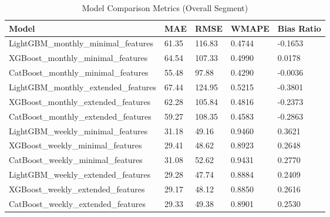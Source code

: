 \begin{table}[hbt!]
\centering
\caption{Model Comparison Metrics (Overall Segment)}
\label{tab:model_comparison}
\begin{tabular}{@{} lllll @{}}
\toprule
\textbf{Model} & \textbf{MAE} & \textbf{RMSE} & \textbf{WMAPE} & \textbf{Bias Ratio} \\
\midrule
LightGBM\_monthly\_minimal\_features & 61.35 & 116.83 & 0.4744 & -0.1653 \\
XGBoost\_monthly\_minimal\_features & 64.54 & 107.33 & 0.4990 & 0.0178 \\
CatBoost\_monthly\_minimal\_features & 55.48 & 97.88 & 0.4290 & -0.0036 \\
LightGBM\_monthly\_extended\_features & 67.44 & 124.95 & 0.5215 & -0.3801 \\
XGBoost\_monthly\_extended\_features & 62.28 & 105.84 & 0.4816 & -0.2373 \\
CatBoost\_monthly\_extended\_features & 59.27 & 108.35 & 0.4583 & -0.2863 \\
LightGBM\_weekly\_minimal\_features & 31.18 & 49.16 & 0.9460 & 0.3621 \\
XGBoost\_weekly\_minimal\_features & 29.41 & 48.62 & 0.8923 & 0.2648 \\
CatBoost\_weekly\_minimal\_features & 31.08 & 52.62 & 0.9431 & 0.2770 \\
LightGBM\_weekly\_extended\_features & 29.28 & 47.74 & 0.8884 & 0.2409 \\
XGBoost\_weekly\_extended\_features & 29.17 & 48.12 & 0.8850 & 0.2616 \\
CatBoost\_weekly\_extended\_features & 29.33 & 49.38 & 0.8901 & 0.2530 \\
\bottomrule
\end{tabular}
\end{table}
